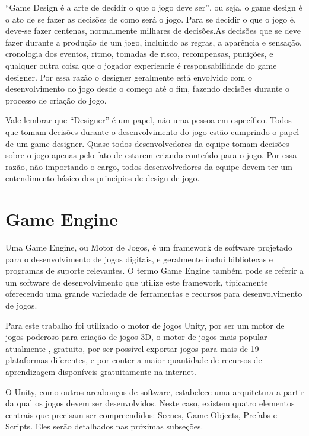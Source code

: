 \documentclass[
	12pt,				%
	openright,			%
	twoside,			%
	a4paper,			%
	english,			%
	french,				%
	spanish,			%
	brazil				%
	]{abntex2}
\begin{document}
“Game Design é a arte de decidir o que o jogo deve ser”, ou seja, o game design é o ato de se fazer as decisões de como será o jogo. Para se decidir o que o jogo é, deve-se fazer centenas, normalmente milhares de decisões.As decisões que se deve fazer durante a produção de um jogo, incluindo as regras, a aparência e sensação, cronologia dos eventos, ritmo, tomadas de risco, recompensas, punições, e qualquer outra coisa que o jogador experiencie é responsabilidade do game designer. Por essa razão o designer geralmente está envolvido com o desenvolvimento do jogo desde o começo até o fim, fazendo decisões durante o processo de criação do jogo. ~\cite{TheArt}

	Vale lembrar que “Designer” é um papel, não uma pessoa em específico. Todos que tomam decisões durante o desenvolvimento do jogo estão cumprindo o papel de um game designer. Quase todos desenvolvedores da equipe tomam decisões sobre o jogo apenas pelo fato de estarem criando conteúdo para o jogo. Por essa razão, não importando o cargo, todos desenvolvedores da equipe devem ter um entendimento básico dos princípios de design de jogo.~\cite{TheArt}

\section{Game Engine}\label{sec:engine}

Uma Game Engine, ou Motor de Jogos, é um framework de software projetado para 
o desenvolvimento de jogos digitais, e geralmente inclui bibliotecas e programas de suporte relevantes. O termo Game Engine também pode se referir a um software de desenvolvimento que utilize este framework, tipicamente oferecendo uma grande variedade de ferramentas e recursos para desenvolvimento de jogos.~\cite{Wiki03}

	Para este trabalho foi utilizado o motor de jogos Unity, por ser um motor de jogos poderoso para criação de jogos 3D, o motor de jogos mais popular atualmente \cite{GameDev:2021}, gratuito, por ser possível exportar jogos para mais de 19 plataformas diferentes, e por conter a maior quantidade de recursos de aprendizagem disponíveis gratuitamente na internet.
	
	O Unity, como outros arcabouços de software, estabelece uma arquitetura a partir da qual os jogos devem ser desenvolvidos. Neste caso, existem quatro elementos centrais que precisam ser compreendidos: Scenes, Game Objects, Prefabs e Scripts. Eles serão detalhados nas próximas subseções.
\end{document}
